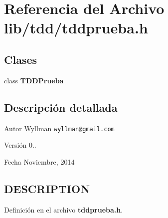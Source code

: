 \section{Referencia del Archivo lib/tdd/tddprueba.h}
\label{tddprueba_8h}
\subsection*{Clases}
\begin{DoxyCompactItemize}
\item 
class {\bf T\+D\+D\+Prueba}
\end{DoxyCompactItemize}


\subsection{Descripción detallada}
\begin{DoxyAuthor}{Autor}
Wyllman {\tt wyllman@gmail.\+com} 
\end{DoxyAuthor}
\begin{DoxyVersion}{Versión}
0.. 
\end{DoxyVersion}
\begin{DoxyDate}{Fecha}
Noviembre, 2014 
\end{DoxyDate}
\subsection{D\+E\+S\+C\+R\+I\+P\+T\+I\+O\+N}\label{main_8cpp_DESCRIPTION}


Definición en el archivo {\bf tddprueba.\+h}.

